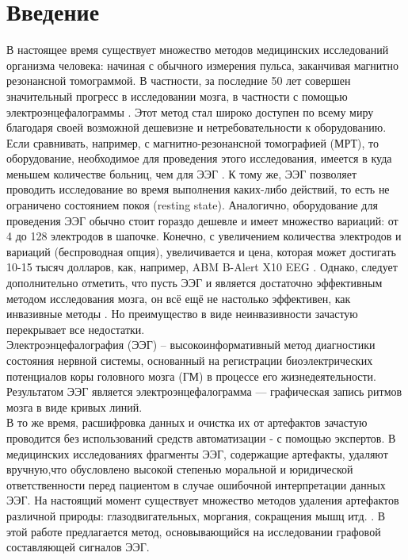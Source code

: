 \documentclass[12pt, a4paper, titlepage]{extreport}
\begin{document}
		
	\setcounter{page}{2}
	\tableofcontents
	
	\chapter*{Введение}
	В настоящее время существует множество методов медицинских исследований организма человека: начиная с обычного измерения пульса, заканчивая магнитно резонансной томограммой. В частности, за последние 50 лет совершен значительный прогресс в исследовании мозга, в частности с помощью электроэнцефалограммы \cite{6}. Этот метод стал широко доступен по всему миру благодаря своей возможной дешевизне и нетребовательности к оборудованию. Если сравнивать, например, с магнитно-резонансной томографией (МРТ), то оборудование, необходимое для проведения этого исследования, имеется в куда меньшем количестве больниц, чем для ЭЭГ \cite{37}. К тому же, ЭЭГ позволяет проводить исследование во время выполнения каких-либо действий, то есть не ограничено состоянием покоя (resting state). Аналогично, оборудование для проведения ЭЭГ обычно стоит гораздо дешевле и имеет множество вариаций: от 4 до 128 электродов в шапочке. Конечно, с увеличением количества электродов и вариаций (беспроводная опция), увеличивается и цена, которая может достигать 10-15 тысяч долларов, как, например, ABM B-Alert X10 EEG \cite{38}. Однако, следует дополнительно отметить, что пусть ЭЭГ и является достаточно эффективным методом исследования мозга, он всё ещё не настолько эффективен, как инвазивные методы \cite{39}. Но преимущество в виде неинвазивности зачастую перекрывает все недостатки.
	\\ Электроэнцефалография (ЭЭГ) – высокоинформативный метод диагностики состояния нервной системы, основанный на регистрации биоэлектрических потенциалов коры головного мозга (ГМ) в процессе его жизнедеятельности.
	Результатом ЭЭГ является электроэнцефалограмма — графическая запись ритмов мозга в виде кривых линий.\\
 	В то же время, расшифровка данных и очистка их от артефактов зачастую проводится без использований средств автоматизации - с помощью экспертов. В медицинских исследованиях фрагменты ЭЭГ, содержащие артефакты, удаляют вручную,что обусловлено высокой степенью моральной и юридической ответственности перед пациентом в случае ошибочной интерпретации данных ЭЭГ. На настоящий момент существует множество методов удаления артефактов различной природы: глазодвигательных, моргания, сокращения мышц итд.  \cite{ 1,2,3,4,5,6,7, 8}. В этой работе предлагается метод, основывающийся на исследовании графовой составляющей сигналов ЭЭГ. \\
\end{document}
